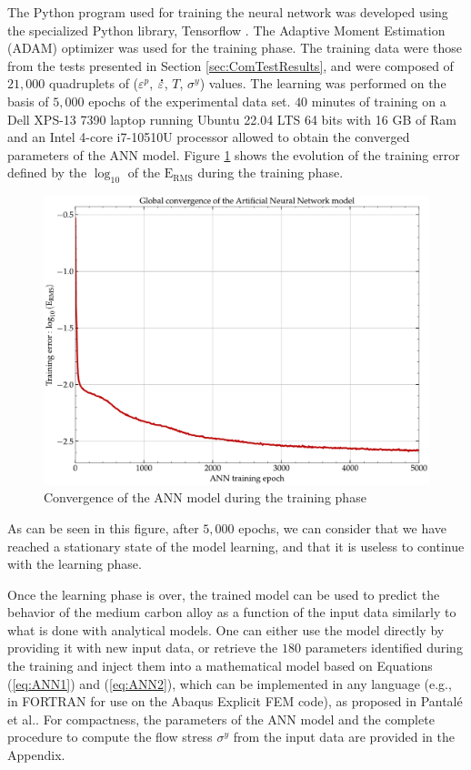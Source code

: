 \documentclass[twoside,english,1p,final,sort&compress]{elsarticle}
\makeatletter
\theoremstyle{plain}
\DeclareRobustCommand{\mdot}[1]{\accentset{\mbox{\bfseries .}}{#1}}
\DeclareRobustCommand{\eal}{et al.\@\xspace}
\DeclareRobustCommand{\eg}{e.g.,\@\xspace}
\DeclareRobustCommand{\RMSE}{\text{E}_\text{RMS}}
\makeatother
\begin{document}
The Python program used for training the neural network was developed using the specialized Python library, Tensorflow \cite{Abadi-2016}.
The Adaptive Moment Estimation (ADAM) optimizer \cite{Kingma-2015} was used for the training phase.
The training data were those from the tests presented in Section \ref{sec:ComTestResults}, and were composed of $21,000$ quadruplets of ($\varepsilon^p$, $\mdot\varepsilon$, $T$, $\sigma^y$) values.
The learning was performed on the basis of $5,000$ epochs of the experimental data set.
$40$ minutes of training on a Dell XPS-13 7390 laptop running Ubuntu 22.04 LTS 64 bits with 16 GB of Ram and an Intel 4-core i7-10510U processor allowed to obtain the converged parameters of the ANN model.
Figure \ref{fig:ANN-6-conv} shows the evolution of the training error defined by the $\log_{10}$ of the $\RMSE$ during the training phase.
\begin{figure}[!ht]
\centering
\includegraphics[width=0.7\columnwidth]
{Figures/Conv-ANN-6}
\caption{Convergence of the ANN model during the training phase}
\label{fig:ANN-6-conv}
\end{figure}
As can be seen in this figure, after $5,000$ epochs, we can consider that we have reached a stationary state of the model learning, and that it is useless to continue with the learning phase.

Once the learning phase is over, the trained model can be used to predict the behavior of the medium carbon alloy as a function of the input data similarly to what is done with analytical models.
One can either use the model directly by providing it with new input data, or retrieve the $180$ parameters identified during the training and inject them into a mathematical model based on Equations (\ref{eq:ANN1}) and (\ref{eq:ANN2}), which can be implemented in any language (\eg in FORTRAN for use on the Abaqus Explicit FEM code), as proposed in Pantalé \eal \cite{Pantale-2021, Pantale-2023}.
For compactness, the parameters of the ANN model and the complete procedure to compute the flow stress $\sigma^y$ from the input data are provided in the Appendix.
\end{document}
